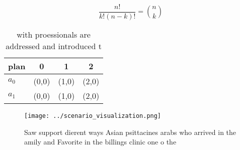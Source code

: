 \documentclass[a4paper]{article}
\begin{document}
\[ \frac{n!}{k!(n-k)!} = \binom{n}{k} \]

\begin{table}
\begin{adjustbox}{width=0.6\columnwidth}
\begin{tabular}{|l|l|l|l|}
\hline
\textbf{plan} & \multicolumn{1}{c|}{\textbf{0}} & \multicolumn{1}{c|}{\textbf{1}} & \multicolumn{1}{c|}{\textbf{2}} \\ \hline
\textbf{$a_0$}  & (0,0) & (1,0) & (2,0) \\ \hline
\textbf{$a_1$}  & (0,0) & (1,0) & (2,0) \\ \hline
\end{tabular}
\end{adjustbox}
\caption{ with proessionals are addressed and introduced t
}
\end{table}

\begin{figure}
\centering
\texttt{[image: ../scenario\_visualization.png]}
\caption{Saw support dierent ways Asian psittacines arabs who arrived in the amily and Favorite in the billings clinic one o the
}
\end{figure}
 
\end{document}
